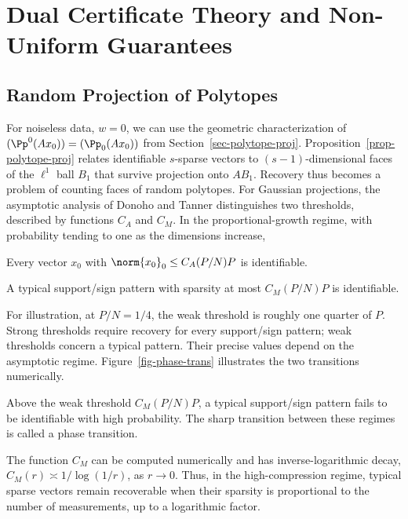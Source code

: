 \section{Dual Certificate Theory and Non-Uniform Guarantees}
\label{sec-cs-certif}

                                    
\subsection{Random Projection of Polytopes}

For noiseless data, $w=0$, we can use the geometric characterization of $(\Pp^0(Ax_0))=(\Pp_0(Ax_0))$ from Section~\ref{sec-polytope-proj}. Proposition~\ref{prop-polytope-proj} relates identifiable $s$-sparse vectors to $(s-1)$-dimensional faces of the $\ell^1$ ball $B_1$ that survive projection onto $AB_1$. Recovery thus becomes a problem of counting faces of random polytopes. For Gaussian projections, the asymptotic analysis of Donoho and Tanner distinguishes two thresholds, described by functions $C_A$ and $C_M$. In the proportional-growth regime, with probability tending to one as the dimensions increase,
\begin{rs}
	\item Every vector $x_0$ with $\norm{x_0}_0 \leq C_A(P/N)P$ is identifiable.
	\item A typical support/sign pattern with sparsity at most $C_M(P/N)P$ is identifiable.
\end{rs}
For illustration, at $P/N=1/4$, the weak threshold is roughly one quarter of $P$. Strong thresholds require recovery for every support/sign pattern; weak thresholds concern a typical pattern. Their precise values depend on the asymptotic regime. Figure~\ref{fig-phase-trans} illustrates the two transitions numerically.
 
Above the weak threshold $C_M(P/N)P$, a typical support/sign pattern fails to be identifiable with high probability. The sharp transition between these regimes is called a phase transition.
 
 
The function $C_M$ can be computed numerically and has inverse-logarithmic decay, $C_M(r)\asymp1/\log(1/r)$, as $r\to0$. Thus, in the high-compression regime, typical sparse vectors remain recoverable when their sparsity is proportional to the number of measurements, up to a logarithmic factor.


